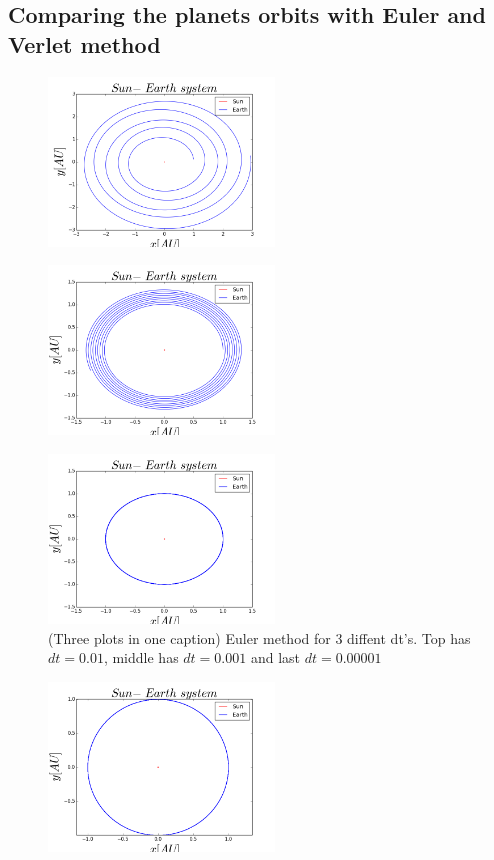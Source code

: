 \documentclass[twocolumn]{article}
\begin{document}
\subsection*{Comparing the planets orbits with Euler and Verlet method}
\begin{figure}[H]
\centering
\includegraphics[width=6cm]{Euler_0_01.png}
\end{figure}
\begin{figure}[H]
\centering
\includegraphics[width=6cm]{Euler_0_001.png}
\end{figure}
\begin{figure}[H]
\centering
\includegraphics[width=6cm]{Euler_0_00001.png}
\caption{(Three plots in one caption) Euler method for 3 diffent dt's. Top has $dt = 0.01$, middle has $dt = 0.001$ and last $dt =0.00001$}
\end{figure}
\begin{figure}[H]
\centering
\includegraphics[width=6cm]{Verlet_0_01.png}
\end{figure}
\end{document}
